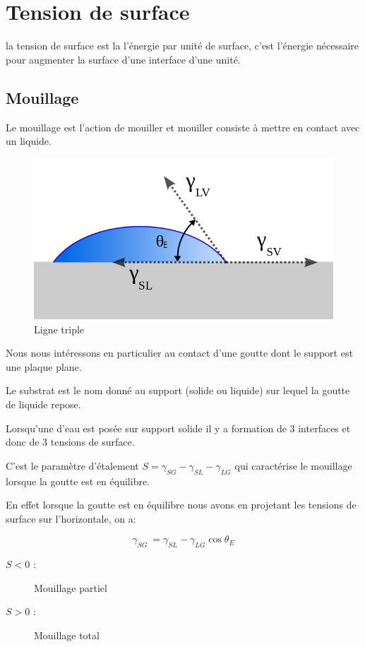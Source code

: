 \documentclass[french]{article}
\begin{document}
\section{Tension de surface}

la tension de surface est la l'énergie par unité de surface, c'est l'énergie nécessaire pour augmenter la surface d'une interface d'une unité.

\subsection{Mouillage}
Le mouillage est l'action de mouiller et mouiller consiste à  mettre en contact avec un liquide.
\begin{figure}[ht]
	\centering
	\includegraphics[scale = 0.3]{./image/Contact_angle2.png}
	\caption{Ligne triple}
\end{figure}

Nous nous intéressons en particulier au contact d'une goutte dont le support est une plaque plane. 


Le substrat est le nom donné au support (solide ou liquide) sur lequel la goutte de liquide repose.

Lorsqu'une d'eau est posée sur support solide il y a formation de 3 interfaces et donc de 3 tensions de surface.


C'est le paramètre d'étalement $S = \gamma_{SG} - \gamma_{SL} - \gamma_{LG}$ qui caractérise le mouillage lorsque la goutte est en équilibre.

En effet lorsque la goutte est en équilibre nous avons en projetant les tensions de surface sur l'horizontale, on a:

\begin{equation}
	\gamma_{SG}\ = \gamma_{SL} - \gamma_{LG}\cos\theta_{E}
\end{equation}
\begin{description}
\item[$S < 0$ :] Mouillage partiel
\item[$S > 0$ :] Mouillage total
\end{description}
\end{document}
